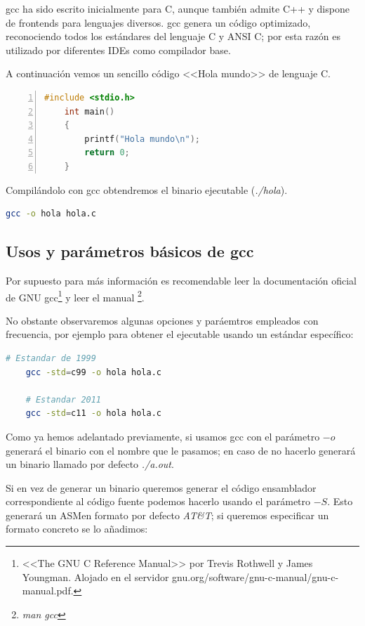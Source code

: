 \documentclass[a4paper, 11pt, titlepage]{article}
\begin{document}
    gcc ha sido escrito inicialmente para C, aunque también admite C++ y dispone de frontends para 
    lenguajes diversos. gcc genera un código optimizado, reconociendo todos los estándares del lenguaje C
    y ANSI C; por esta razón es utilizado por diferentes IDEs como compilador base.

    A continuación vemos un sencillo código <<Hola mundo>> de lenguaje C.

    \begin{lstlisting}[language=C,numbers=left]
    #include <stdio.h>
    int main()
    {
        printf("Hola mundo\n");
        return 0;
    }\end{lstlisting}

    Compilándolo con gcc obtendremos el binario ejecutable (\textit{./hola}).
    
    \begin{lstlisting}[language=bash]
    gcc -o hola hola.c\end{lstlisting}
        
    \subsection{Usos y parámetros básicos de gcc}

        Por supuesto para más información es recomendable leer la documentación oficial de GNU gcc\footnote{
            <<The GNU C Reference Manual>> por Trevis Rothwell y James Youngman. Alojado en el 
            servidor gnu.org/software/gnu-c-manual/gnu-c-manual.pdf.
        } y leer el manual \footnote{
            \textit{man gcc}
        }.

        No obstante observaremos algunas opciones y paráemtros empleados con frecuencia, por ejemplo para obtener 
        el ejecutable usando un estándar específico:

        \begin{lstlisting}[language=bash]
    # Estandar de 1999
    gcc -std=c99 -o hola hola.c

    # Estandar 2011
    gcc -std=c11 -o hola hola.c\end{lstlisting}

        Como ya hemos adelantado previamente, si usamos gcc con el parámetro $-o$ generará el binario con el nombre
        que le pasamos; en caso de no hacerlo generará un binario llamado por defecto \textit{./a.out}. 
        
        Si en vez de generar un binario queremos generar el código ensamblador correspondiente al código fuente 
        podemos hacerlo usando el parámetro $-S$. Esto generará un ASMen formato por defecto \textit{AT\&T}; si queremos
        especificar un formato concreto se lo añadimos:
\end{document}
